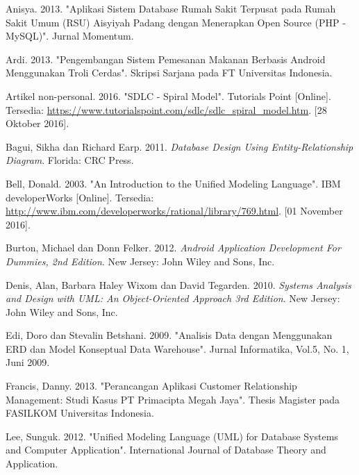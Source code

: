 \documentclass{jtetiskripsi}
\begin{document}
%
\begin{thebibliography}{99}
	Anisya. 2013. "Aplikasi Sistem Database Rumah Sakit Terpusat pada Rumah Sakit Umum (RSU) Aisyiyah Padang dengan Menerapkan Open Source (PHP - MySQL)". Jurnal Momentum.
	
	 Ardi. 2013. "Pengembangan Sistem Pemesanan Makanan Berbasis Android Menggunakan Troli Cerdas". Skripsi Sarjana pada FT Universitas Indonesia.
	
	 Artikel non-personal.  2016. "SDLC - Spiral Model".  Tutorials Point [Online]. Tersedia: \url{https://www.tutorialspoint.com/sdlc/sdlc_spiral_model.htm}. [28 Oktober 2016].
	
	Bagui, Sikha dan Richard Earp. 2011. \textit{Database Design Using Entity-Relationship Diagram}. Florida: CRC Press.	
	
	 Bell, Donald.  2003. "An Introduction to the Unified Modeling Language".  IBM developerWorks [Online]. Tersedia: \url{http://www.ibm.com/developerworks/rational/library/769.html}. [01 November 2016].
	
	Burton, Michael dan Donn Felker. 2012. \textit{Android Application Development For Dummies, 2nd Edition}. New Jersey: John Wiley and Sons, Inc.	
	
	Denis, Alan, Barbara Haley Wixom dan David Tegarden. 2010. \textit{Systems Analysis and Design with UML: An Object-Oriented Approach 3rd Edition}. New Jersey: John Wiley and Sons, Inc.
	
	 Edi, Doro dan Stevalin Betshani. 2009. "Analisis Data dengan Menggunakan ERD dan Model Konseptual Data Warehouse". Jurnal Informatika, Vol.5, No. 1, Juni 2009.
	
	 Francis, Danny. 2013. "Perancangan Aplikasi Customer Relationship Management: Studi Kasus PT Primacipta Megah Jaya". Thesis Magister pada FASILKOM Universitas Indonesia.

	 Lee, Sunguk. 2012. "Unified Modeling Language (UML) for Database Systems and Computer Application". International Journal of Database Theory and Application.
	

\end{thebibliography}
\end{document}
